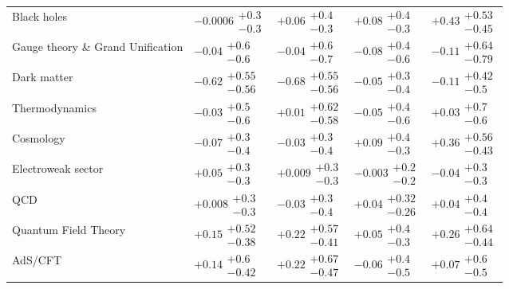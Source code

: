 \begin{table}[H]
\begin{tabular}{lllll}
Black holes & $-0.0006\substack{+0.3 \\ -0.3}$ & $+0.06\substack{+0.4 \\ -0.3}$ & $+0.08\substack{+0.4 \\ -0.3}$ & $+0.43\substack{+0.53 \\ -0.45}$ \\
Gauge theory \& Grand Unification & $-0.04\substack{+0.6 \\ -0.6}$ & $-0.04\substack{+0.6 \\ -0.7}$ & $-0.08\substack{+0.4 \\ -0.6}$ & $-0.11\substack{+0.64 \\ -0.79}$ \\
Dark matter & $\bm{-0.62}\substack{+0.55 \\ -0.56}$ & $\bm{-0.68}\substack{+0.55 \\ -0.56}$ & $-0.05\substack{+0.3 \\ -0.4}$ & $-0.11\substack{+0.42 \\ -0.5}$ \\
Thermodynamics & $-0.03\substack{+0.5 \\ -0.6}$ & $+0.01\substack{+0.62 \\ -0.58}$ & $-0.05\substack{+0.4 \\ -0.6}$ & $+0.03\substack{+0.7 \\ -0.6}$ \\
Cosmology & $-0.07\substack{+0.3 \\ -0.4}$ & $-0.03\substack{+0.3 \\ -0.4}$ & $+0.09\substack{+0.4 \\ -0.3}$ & $+0.36\substack{+0.56 \\ -0.43}$ \\
Electroweak sector & $+0.05\substack{+0.3 \\ -0.3}$ & $+0.009\substack{+0.3 \\ -0.3}$ & $-0.003\substack{+0.2 \\ -0.2}$ & $-0.04\substack{+0.3 \\ -0.3}$ \\
QCD & $+0.008\substack{+0.3 \\ -0.3}$ & $-0.03\substack{+0.3 \\ -0.4}$ & $+0.04\substack{+0.32 \\ -0.26}$ & $+0.04\substack{+0.4 \\ -0.4}$ \\
Quantum Field Theory & $+0.15\substack{+0.52 \\ -0.38}$ & $+0.22\substack{+0.57 \\ -0.41}$ & $+0.05\substack{+0.4 \\ -0.3}$ & $+0.26\substack{+0.64 \\ -0.44}$ \\
AdS/CFT & $+0.14\substack{+0.6 \\ -0.42}$ & $+0.22\substack{+0.67 \\ -0.47}$ & $-0.06\substack{+0.4 \\ -0.5}$ & $+0.07\substack{+0.6 \\ -0.5}$ \\
\bottomrule
\end{tabular}\normalsize\renewcommand{\arraystretch}{1}
\end{table}
